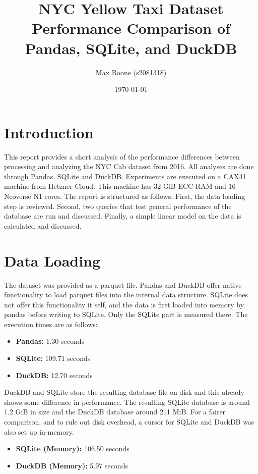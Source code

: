 \documentclass[a4paper,10pt]{article}
\title{
  NYC Yellow Taxi Dataset \\
\small Performance Comparison of Pandas, SQLite, and DuckDB}
\author{Max Boone (s2081318)}
\date{\today}
\begin{document}
\maketitle

\section{Introduction}

This report provides a short analysis of the performance differences
between processing and analyzing the NYC Cab dataset from 2016. All
analyses are done through Pandas, SQLite and DuckDB. Experiments are 
executed on a CAX41 machine from Hetzner Cloud. This
machine has 32 GiB ECC RAM and 16 Neoverse N1 cores.
The report is structured as follows. First, the data
loading step is reviewed. Second, two queries that test general
performance of the database are run and discussed. Finally, a simple
linear model on the data is calculated and discussed.

\section{Data Loading}

The dataset was provided as a parquet file. Pandas and DuckDB offer
native functionality to load parquet files into the internal data
structure. SQLite does not offer this functionality it self, and
the data is first loaded into memory by pandas before writing to
SQLite. Only the SQLite part is measured there.
The execution times are as follows:

\begin{itemize}
  \item \textbf{Pandas:} 1.30 seconds
  \item \textbf{SQLite:} 109.71 seconds
  \item \textbf{DuckDB:} 12.70 seconds
\end{itemize}

DuckDB and SQLite store the resulting database file on disk and this
already shows some difference in performance. The resulting SQLite database
is around 1.2 GiB in size and the DuckDB database around 211 MiB. For a fairer
comparison, and to rule out disk overhead, a cursor for SQLite and DuckDB was
also set up in-memory.

\begin{itemize}
  \item \textbf{SQLite (Memory):} 106.50 seconds
  \item \textbf{DuckDB (Memory):} 5.97 seconds
\end{itemize}
\end{document}
